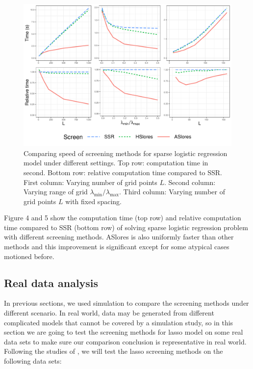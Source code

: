 \begin{figure}[h]
    \centering
    \includegraphics[scale = 0.59]{plots/512b.pdf}    \caption{Comparing speed of screening methods for sparse logistic regression model under different settings. Top row: computation time in second. Bottom row: relative computation time compared to SSR. First column: Varying number of grid points $L$. Second column: Varying range of grid $\lambda_{\min}/\lambda_{\max}$. Third column: Varying number of grid points $L$ with fixed spacing.}
    \label{fig:5.1.2b}
\end{figure}

Figure 4 and 5 show the computation time (top row) and relative computation time compared to SSR (bottom row) of solving sparse logistic regression problem with different screening methods. ASlores is also uniformly faster than other methods and this improvement is significant except for some atypical cases motioned before.


\subsection{Real data analysis}
\label{sec:real-data}

In previous sections, we used simulation to compare the screening methods under different scenario. In real world, data may be generated from different complicated models that cannot be covered by a simulation study, so in this section we are going to test the screening methods for lasso model on some real data sets to make sure our comparison conclusion is representative in real world. Following the studies of \citep{wang2013lasso, xiang2016screening, Zeng2021}, we will test the lasso screening methods on the following data sets:

